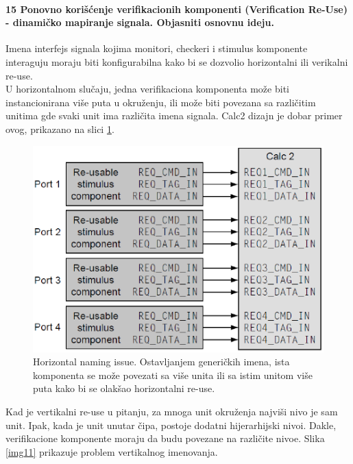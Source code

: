 \documentclass[a4paper, 12pt]{article}
\begin{document}
\paragraph{15 Ponovno korišćenje verifikacionih komponenti (Verification Re-Use) - dinamičko mapiranje signala. Objasniti osnovnu ideju.}
\hfill \break
\indent Imena interfejs signala kojima monitori, checkeri i stimulus komponente interaguju moraju biti konfigurabilna kako bi se dozvolio horizontalni ili verikalni re-use.\\
\indent U horizontalnom slučaju, jedna verifikaciona komponenta može biti instancionirana više puta u okruženju, ili može biti povezana sa različitim unitima gde svaki unit ima različita imena signala. Calc2 dizajn je dobar primer ovog, prikazano na slici \ref{img10}.\\
\begin{figure}[h!]
\centering
\includegraphics[scale=0.5]{img10.png}
\caption{Horizontal naming issue. Ostavljanjem generičkih imena, ista komponenta se može povezati sa više unita ili sa istim unitom više puta kako bi se olakšao horizontalni re-use.}
\label{img10}
\end{figure}
\indent Kad je vertikalni re-use u pitanju, za mnoga unit okruženja najviši nivo je sam unit. Ipak, kada je unit unutar čipa, postoje dodatni hijerarhijski nivoi. Dakle, verifikacione komponente moraju da budu povezane na različite nivoe. Slika \ref{img11} prikazuje problem vertikalnog imenovanja.
\end{document}
